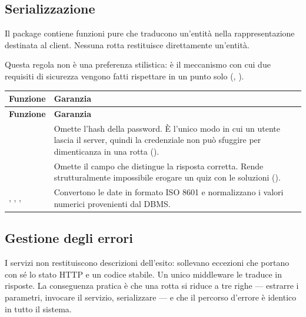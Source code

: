 \subsection{Serializzazione}
\label{sec:sdd-dto}

Il package  contiene funzioni pure che traducono un'entità nella
rappresentazione destinata al client. Nessuna rotta restituisce
direttamente un'entità.

Questa regola non è una preferenza stilistica: è il meccanismo con cui due
requisiti di sicurezza vengono fatti rispettare in un punto solo
(, ).

\begin{longtable}{@{}L{4.0cm} L{10.4cm}@{}}
\toprule
\textbf{Funzione} & \textbf{Garanzia} \\
\midrule
\endfirsthead
\toprule
\textbf{Funzione} & \textbf{Garanzia} \\
\midrule
\endhead
\bottomrule
\endlastfoot

 &
Omette l'hash della password. È l'unico modo in cui un utente lascia il
server, quindi la credenziale non può sfuggire per dimenticanza in una rotta
(). \\

 &
Omette il campo che distingue la risposta corretta. Rende
strutturalmente impossibile erogare un quiz con le soluzioni
(). \\

, , ,  &
Convertono le date in formato ISO 8601 e normalizzano i valori numerici
provenienti dal DBMS. \\

\end{longtable}

\subsection{Gestione degli errori}
\label{sec:sdd-errori}


I servizi non restituiscono descrizioni dell'esito: sollevano eccezioni che
portano con sé lo stato HTTP e un codice stabile. Un unico middleware le
traduce in risposte. La conseguenza pratica è che una rotta si riduce a tre
righe — estrarre i parametri, invocare il servizio, serializzare — e che il
percorso d'errore è identico in tutto il sistema.

